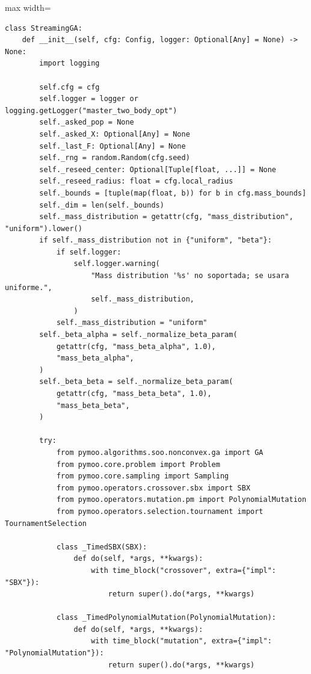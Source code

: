 \begin{listing}[H]
\caption{Bloque de código de \texttt{StreamingGA.\_\_init\_\_}}
\begin{adjustbox}{max width=\textwidth}
\begin{minipage}{0.85\textwidth}
\begin{verbatim}
class StreamingGA:
    def __init__(self, cfg: Config, logger: Optional[Any] = None) -> None:
        import logging

        self.cfg = cfg
        self.logger = logger or logging.getLogger("master_two_body_opt")
        self._asked_pop = None
        self._asked_X: Optional[Any] = None
        self._last_F: Optional[Any] = None
        self._rng = random.Random(cfg.seed)
        self._reseed_center: Optional[Tuple[float, ...]] = None
        self._reseed_radius: float = cfg.local_radius
        self._bounds = [tuple(map(float, b)) for b in cfg.mass_bounds]
        self._dim = len(self._bounds)
        self._mass_distribution = getattr(cfg, "mass_distribution", "uniform").lower()
        if self._mass_distribution not in {"uniform", "beta"}:
            if self.logger:
                self.logger.warning(
                    "Mass distribution '%s' no soportada; se usara uniforme.",
                    self._mass_distribution,
                )
            self._mass_distribution = "uniform"
        self._beta_alpha = self._normalize_beta_param(
            getattr(cfg, "mass_beta_alpha", 1.0),
            "mass_beta_alpha",
        )
        self._beta_beta = self._normalize_beta_param(
            getattr(cfg, "mass_beta_beta", 1.0),
            "mass_beta_beta",
        )

        try:
            from pymoo.algorithms.soo.nonconvex.ga import GA
            from pymoo.core.problem import Problem
            from pymoo.core.sampling import Sampling
            from pymoo.operators.crossover.sbx import SBX
            from pymoo.operators.mutation.pm import PolynomialMutation
            from pymoo.operators.selection.tournament import TournamentSelection

            class _TimedSBX(SBX):
                def do(self, *args, **kwargs):
                    with time_block("crossover", extra={"impl": "SBX"}):
                        return super().do(*args, **kwargs)

            class _TimedPolynomialMutation(PolynomialMutation):
                def do(self, *args, **kwargs):
                    with time_block("mutation", extra={"impl": "PolynomialMutation"}):
                        return super().do(*args, **kwargs)


\end{verbatim}
\end{minipage}
\end{adjustbox}
\end{listing}
